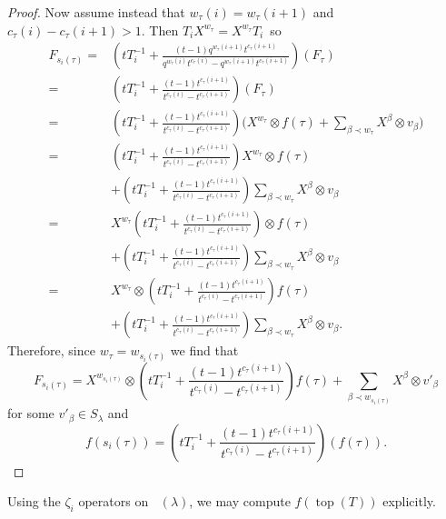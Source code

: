 \documentclass[pdftex]{sigma}
\numberwithin{equation}{section}
\theoremstyle{definition}
\DeclareMathOperator{\PSYT}{\mathrm{PSYT}_{\geq 0}}
\DeclareMathOperator{\Top}{\mathrm{top}}
\begin{document}
\begin{proof}
 Now assume instead that $w_{\tau}(i) = w_{\tau}(i+1)$ and $c_{\tau}(i) - c_{\tau}(i+1) > 1$. Then ${T_iX^{w_{\tau}} = X^{w_{\tau}}T_i}$~so
 \begin{align*}
 F_{s_i(\tau)} = {}&\left( tT_{i}^{-1} + \frac{(t-1)q^{w_{\tau}(i+1)}t^{c_{\tau}(i+1)}}{q^{w_{\tau}(i)}t^{c_{\tau}(i)}-q^{w_{\tau}(i+1)}t^{c_{\tau}(i+1)}}\right)(F_{\tau}) \\
 = {}& \left( tT_{i}^{-1} + \frac{(t-1)t^{c_{\tau}(i+1)}}{t^{c_{\tau}(i)}-t^{c_{\tau}(i+1)}}\right)(F_{\tau}) \\
 = {}& \left( tT_{i}^{-1} + \frac{(t-1)t^{c_{\tau}(i+1)}}{t^{c_{\tau}(i)}-t^{c_{\tau}(i+1)}}\right) \biggl(X^{w_{\tau}}\otimes f(\tau) + \sum_{\beta \prec w_{\tau}} X^{\beta}\otimes v_{\beta} \biggr) \\
 = {}& \left( tT_{i}^{-1} + \frac{(t-1)t^{c_{\tau}(i+1)}}{t^{c_{\tau}(i)}-t^{c_{\tau}(i+1)}}\right)X^{w_{\tau}}\otimes f(\tau) \\
 &+ \left( tT_{i}^{-1} + \frac{(t-1)t^{c_{\tau}(i+1)}}{t^{c_{\tau}(i)}-t^{c_{\tau}(i+1)}}\right)\sum_{\beta \prec w_{\tau}} X^{\beta}\otimes v_{\beta} \\
 = {}& X^{w_{\tau}}\left( tT_{i}^{-1} + \frac{(t-1)t^{c_{\tau}(i+1)}}{t^{c_{\tau}(i)}-t^{c_{\tau}(i+1)}}\right)\otimes f(\tau) \\
 &+ \left( tT_{i}^{-1} + \frac{(t-1)t^{c_{\tau}(i+1)}}{t^{c_{\tau}(i)}-t^{c_{\tau}(i+1)}}\right)\sum_{\beta \prec w_{\tau}} X^{\beta}\otimes v_{\beta} \\
 = {}& X^{w_{\tau}} \otimes \left( tT_{i}^{-1} + \frac{(t-1)t^{c_{\tau}(i+1)}}{t^{c_{\tau}(i)}-t^{c_{\tau}(i+1)}}\right) f(\tau)\\
 &+ \left( tT_{i}^{-1} + \frac{(t-1)t^{c_{\tau}(i+1)}}{t^{c_{\tau}(i)}-t^{c_{\tau}(i+1)}}\right)\sum_{\beta \prec w_{\tau}} X^{\beta}\otimes v_{\beta}.
 \end{align*}
 Therefore, since $w_{\tau} = w_{s_i(\tau)}$ we find that
 \[
 F_{s_i(\tau)} = X^{w_{s_i(\tau)}}\otimes \left( tT_{i}^{-1} + \frac{(t-1)t^{c_{\tau}(i+1)}}{t^{c_{\tau}(i)}-t^{c_{\tau}(i+1)}}\right) f(\tau) + \sum_{\beta \prec w_{s_i(\tau)}} X^{\beta}\otimes v'_{\beta}
 \]
 for some $v'_{\beta} \in S_{\lambda}$ and
 \[
 f(s_i(\tau)) = \left( tT_i^{-1} + \frac{(t-1)t^{c_{\tau}(i+1)}}{t^{c_{\tau}(i)} - t^{c_{\tau}(i+1)}} \right)(f(\tau)).\tag*{\qed}
 \] \renewcommand{\qed}{}
\end{proof}

Using the $\zeta_i$ operators on $\PSYT(\lambda)$, we may compute $f(\Top(T))$ explicitly.
\end{document}
